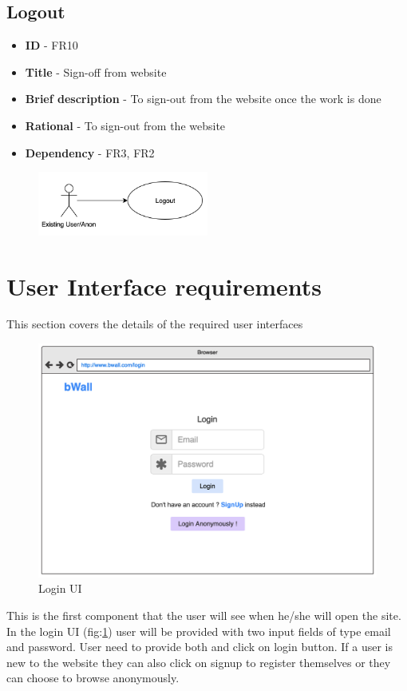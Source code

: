 \documentclass[12pt]{report}
\begin{document}
\subsection{Logout}
\begin{itemize}
    \item \textbf{ID} - FR10
    \item \textbf{Title} - Sign-off from website
    \item \textbf{Brief description} - To sign-out from the website once the work is done
    \item \textbf{Rational} - To sign-out from the website
    \item \textbf{Dependency} - FR3, FR2
\end{itemize}
\begin{figure}[h]
\includegraphics[width=0.5\textwidth]{logout.png}
\end{figure}
\vspace{2pt}

\section{User Interface requirements}
This section covers the details of the required user interfaces 

\begin{figure}[H]
\centering
\includegraphics[width=12cm]{uilogin.png}
\caption{Login UI}
\label{fig:loginui}
\end{figure}
This is the first component that the user will see when he/she will open the site. In the login UI (fig:\ref{fig:loginui}) user will be provided with two input fields of type email and password. User need to provide both and click on login button. If a user is new to the website they can also click on signup to register themselves or they can choose to browse anonymously.
\end{document}
